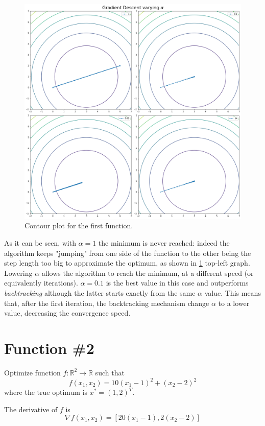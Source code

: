 \documentclass[a4paper,10pt]{report}
\begin{document}
\begin{figure}[!htb]
  \center
  \includegraphics[width=0.8\linewidth]{1_c.png}
  \caption{Contour plot for the first function.}
  \label{fig:1c}
\end{figure}

As it can be seen, with $\alpha=1$ the minimum is never reached: indeed the algorithm keeps "jumping" from one side of the function to the other being the step length too big to approximate the optimum, as shown in \ref{fig:1c} top-left graph.
Lowering $\alpha$ allows the algorithm to reach the minimum, at a different speed (or equivalently iterations). $\alpha=0.1$ is the best value in this case and outperforms \emph{backtracking} although the latter starts exactly from the same $\alpha$ value.
This means that, after the first iteration, the backtracking mechanism change $\alpha$ to a lower value, decreasing the convergence speed.

\section{Function \#2}
Optimize function $f:\mathbb{R}^2 \rightarrow \mathbb{R}$ such that
\begin{equation}
  f(x_1,x_2)=10(x_1-1)^2+(x_2-2)^2
\end{equation}
where the true optimum is $x^*=(1,2)^T$.

The derivative of $f$ is
\begin{equation}
  \nabla f(x_1,x_2)= [20(x_1-1),2(x_2-2)]
\end{equation}
\end{document}
